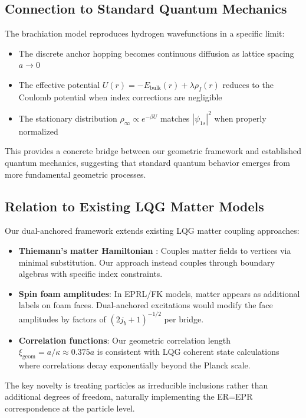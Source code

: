 \documentclass[11pt]{article}
\theoremstyle{plain}
\theoremstyle{definition}
\begin{document}
\subsection{Connection to Standard Quantum Mechanics}
The brachiation model reproduces hydrogen wavefunctions in a specific limit:
\begin{itemize}
  \item The discrete anchor hopping becomes continuous diffusion as lattice spacing $a \to 0$
  \item The effective potential $U(r) = -E_{\text{bulk}}(r) + \lambda\rho_I(r)$ reduces to the Coulomb potential when index corrections are negligible
  \item The stationary distribution $\rho_\infty \propto e^{-\beta U}$ matches $|\psi_{1s}|^2$ when properly normalized
\end{itemize}
This provides a concrete bridge between our geometric framework and established quantum mechanics, suggesting that standard quantum behavior emerges from more fundamental geometric processes.

\subsection{Relation to Existing LQG Matter Models}
\label{subsec:lqg-context}

Our dual-anchored framework extends existing LQG matter coupling approaches:
\begin{itemize}
  \item \textbf{Thiemann's matter Hamiltonian} \cite{loopqg}: Couples matter fields to vertices via minimal substitution. Our approach instead couples through boundary algebras with specific index constraints.
  \item \textbf{Spin foam amplitudes}: In EPRL/FK models, matter appears as additional labels on foam faces. Dual-anchored excitations would modify the face amplitudes by factors of $(2j_b+1)^{-1/2}$ per bridge.
  \item \textbf{Correlation functions}: Our geometric correlation length $\xi_{\mathrm{geom}} = a/\kappa \approx 0.375a$ is consistent with LQG coherent state calculations where correlations decay exponentially beyond the Planck scale.
\end{itemize}

The key novelty is treating particles as irreducible inclusions rather than additional degrees of freedom, naturally implementing the ER=EPR correspondence at the particle level.
\end{document}
